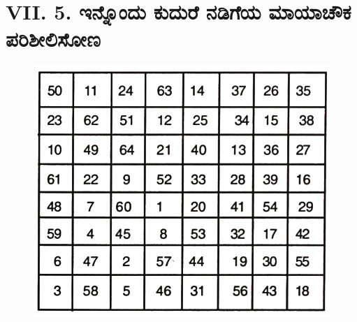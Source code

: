 \section*{VII. 5. ಇನ್ನೊಂದು ಕುದುರೆ ನಡಿಗೆಯ ಮಾಯಾಚೌಕ ಪರಿಶೀಲಿಸೋಣ}
	\begin{figure}[H]
	\includegraphics[scale=0.8]{src/figures/chap6/fig6.7.jpg}
	\end{figure}
